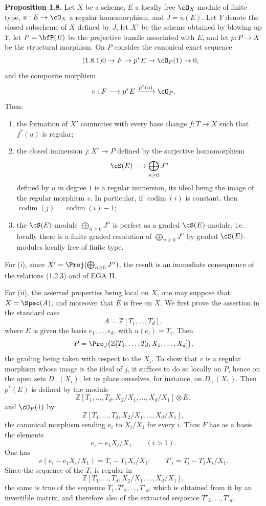 \textbf{Proposition 1.8.} Let \(X\) be a scheme, \(E\) a locally free \(\cO_X\)-module of finite type, \(u:E\to\cO_X\) a regular homomorphism, and \(J=u(E)\). Let \(Y\) denote the closed subscheme of \(X\) defined by \(J\), let \(X'\) be the scheme obtained by blowing up \(Y\), let \(P=\bfP(E)\) be the projective bundle associated with \(E\), and let \(p:P\to X\) be the structural morphism. On \(P\) consider the canonical exact sequence
\begin{equation}\tag{1.8.1}
0\to F\to p^*E\to\cO_P(1)\to0,
\end{equation}
and the composite morphism
\[
  v:F\longrightarrow p^*E\xrightarrow{p^*(u)}\cO_P .
\]
Then:
\begin{enumerate}
\item the formation of \(X'\) commutes with every base change \(f:T\to X\) such that \(f^*(u)\) is regular;
\item the closed immersion \(j:X'\to P\) defined by the surjective homomorphism
\[
  \cS(E)\longrightarrow\bigoplus_{n\ge0}J^n
\]
defined by \(u\) in degree \(1\) is a regular immersion, its ideal being the image of the regular morphism \(v\). In particular, if \(\operatorname{codim}(i)\) is constant, then \(\operatorname{codim}(j)=\operatorname{codim}(i)-1\);
\item the \(\cS(E)\)-module \(\bigoplus_{n\ge0}J^n\) is perfect as a graded \(\cS(E)\)-module, i.e. locally there is a finite graded resolution of \(\bigoplus_{n\ge0}J^n\) by graded \(\cS(E)\)-modules locally free of finite type.
\end{enumerate}

For (i), since \(X'=\Proj(\bigoplus_{n\ge0}J^n)\), the result is an immediate consequence of the relations (1.2.3) and of EGA II.

For (ii), the asserted properties being local on \(X\), one may suppose that \(X=\Spec(A)\), and moreover that \(E\) is free on \(X\). We first prove the assertion in the standard case
\[
  A=\mathbb Z[T_1,\ldots,T_d],
\]
where \(E\) is given the basis \(e_1,\ldots,e_d\), with \(u(e_i)=T_i\). Then
\[
  P=\Proj\bigl(\mathbb Z[T_1,\ldots,T_d,X_1,\ldots,X_d]\bigr),
\]
the grading being taken with respect to the \(X_i\). To show that \(v\) is a regular morphism whose image is the ideal of \(j\), it suffices to do so locally on \(P\), hence on the open sets \(D_+(X_i)\); let us place ourselves, for instance, on \(D_+(X_1)\). Then \(p^*(E)\) is defined by the module
\[
  \mathbb Z[T_1,\ldots,T_d,X_2/X_1,\ldots,X_d/X_1]\otimes E,
\]
and \(\cO_P(1)\) by
\[
  \mathbb Z[T_1,\ldots,T_d,X_2/X_1,\ldots,X_d/X_1],
\]
the canonical morphism sending \(e_i\) to \(X_i/X_1\) for every \(i\). Thus \(F\) has as a basis the elements
\[
  e_i-e_1X_i/X_1\qquad (i>1).
\]
One has
\[
  v(e_i-e_1X_i/X_1)=T_i-T_1X_i/X_1;
  \qquad T'_i=T_i-T_1X_i/X_1.
\]
Since the sequence of the \(T_i\) is regular in
\[
\mathbb Z[T_1,\ldots,T_d,X_2/X_1,\ldots,X_d/X_1],
\]
the same is true of the sequence \(T_1,T'_2,\ldots,T'_d\), which is obtained from it by an invertible matrix, and therefore also of the extracted sequence \(T'_2,\ldots,T'_d\).

